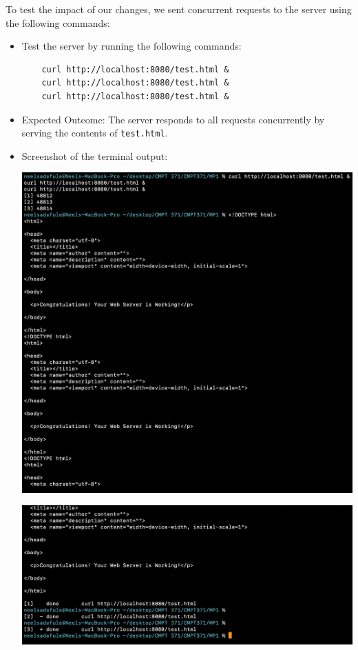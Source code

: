 \documentclass{article}
\begin{document}
To test the impact of our changes, we sent concurrent requests to the server using the following commands:
\begin{itemize}
    \item Test the server by running the following commands:
    \begin{lstlisting}
    curl http://localhost:8080/test.html &
    curl http://localhost:8080/test.html &
    curl http://localhost:8080/test.html &
    \end{lstlisting}
    \item Expected Outcome: The server responds to all requests concurrently by serving the contents of \texttt{test.html}.
    \item Screenshot of the terminal output:
    \begin{center}
        \includegraphics[width=\textwidth]{screenshots/multithreaded_test1.png}  %
    \end{center}
    \begin{center}
        \includegraphics[width=\textwidth]{screenshots/multithreaded_test2.png}  %
    \end{center}
\end{itemize}
\end{document}
